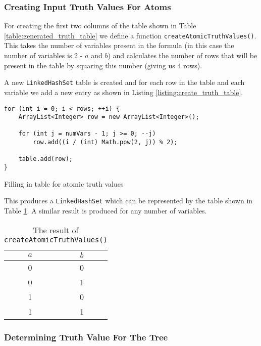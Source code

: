 \documentclass{report}
\begin{document}
\subsubsection{Creating Input Truth Values For Atoms}

For creating the first two columns of the table shown in Table \ref{table:generated_truth_table} we define a function {\tt createAtomicTruthValues()}. This takes the number of variables present in the formula (in this case the number of variables is 2 - $a$ and $b$) and calculates the number of rows that will be present in the table by squaring this number (giving us 4 rows).

A new {\tt LinkedHashSet} table is created and for each row in the table and each variable we add a new entry as shown in Listing \ref{listing:create_truth_table}.

\begin{listing}[ht]
\begin{verbatim} 
for (int i = 0; i < rows; ++i) {
    ArrayList<Integer> row = new ArrayList<Integer>();

    for (int j = numVars - 1; j >= 0; --j)
        row.add((i / (int) Math.pow(2, j)) % 2);

    table.add(row);
}
\end{verbatim}
\caption{Filling in table for atomic truth values}
\label{listing:create_truth_table}
\end{listing}

This produces a {\tt LinkedHashSet} which can be represented by the table shown in Table \ref{table:generated_atomic_truth_values}. A similar result is produced for any number of variables.

\begin{table}[h]
  \begin{center}
    \begin{tabular}{ | c | c | }
      \hline
      $a$ & $b$ \\ \hline
      0 & 0 \\
      0 & 1 \\
      1 & 0 \\
      1 & 1 \\
      \hline
    \end{tabular}
  \end{center}
  \caption{The result of {\tt createAtomicTruthValues()}}
  \label{table:generated_atomic_truth_values}
\end{table}

\subsubsection{Determining Truth Value For The Tree}
\end{document}
